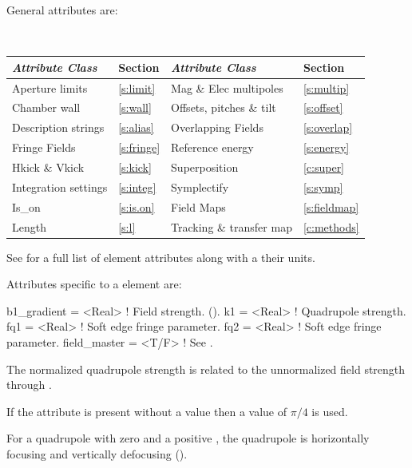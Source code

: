 {General  attributes are:
\begin{center}
\tt
\begin{tabular}{llll} \toprule
  {\sl Attribute Class}      & Section           & {\sl Attribute Class}      & Section            \\ \midrule
  Aperture limits            & \ref{s:limit}     & Mag \& Elec multipoles     & \ref{s:multip}     \\
  Chamber wall               & \ref{s:wall}      & Offsets, pitches \& tilt   & \ref{s:offset}     \\
  Description strings        & \ref{s:alias}     & Overlapping Fields         & \ref{s:overlap}    \\
  Fringe Fields              & \ref{s:fringe}    & Reference energy           & \ref{s:energy}     \\ 
  Hkick \& Vkick             & \ref{s:kick}      & Superposition              & \ref{c:super}      \\
  Integration settings       & \ref{s:integ}     & Symplectify                & \ref{s:symp}       \\
  Is_on                      & \ref{s:is.on}     & Field Maps                 & \ref{s:fieldmap}   \\ 
  Length                     & \ref{s:l}         & Tracking \& transfer map   & \ref{c:methods}    \\ 
  \bottomrule
\end{tabular}
\end{center}
\toffset
See  for a full list of element attributes along with a their units.

Attributes specific to a  element are:
\begin{example}
  b1_gradient  = <Real>    ! Field strength. ().
  k1           = <Real>    ! Quadrupole strength.
  fq1          = <Real>    ! Soft edge fringe parameter.
  fq2          = <Real>    ! Soft edge fringe parameter.
  field_master = <T/F>     ! See .
 \end{example}
The normalized quadrupole  strength is related to the unnormalized  field
strength through .

If the  attribute is present without a value then a value of $\pi/4$
is used.

For a quadrupole with zero  and a positive , the
quadrupole is horizontally focusing and vertically defocusing
().

}
